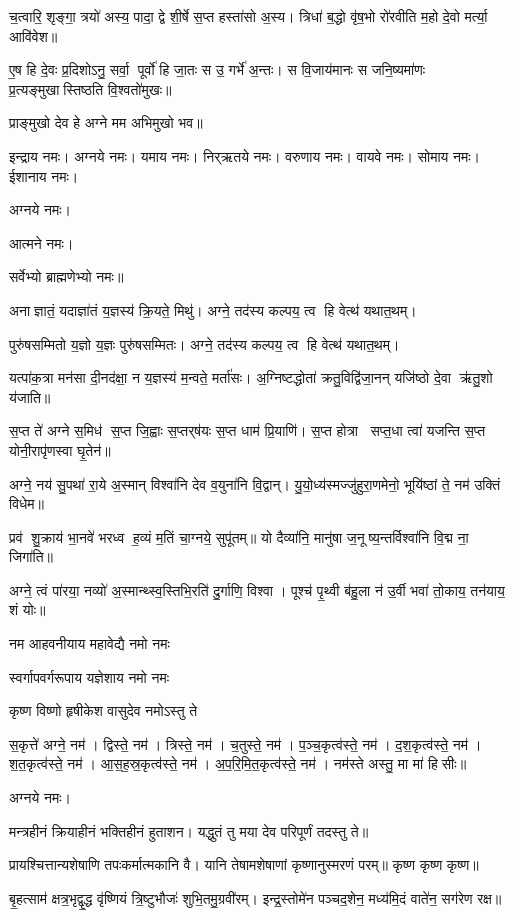 
च॒त्वारि॒ शृङ्गा॒ त्रयो॑ अस्य॒ पादा॒ द्वे शी॒र्\mbox{}षे स॒प्त हस्ता॑सो अ॒स्य। त्रिधा॑ ब॒द्धो वृ॑ष॒भो रो॑रवीति म॒हो दे॒वो मर्त्या॒ आवि॑वेश॥

ए॒ष हि दे॒वः प्र॒दिशोऽनु॒ सर्वा॒ पूर्वो॑ हि जा॒तः स उ॒ गर्भे॑ अ॒न्तः। स वि॒जाय॑मानः स जनि॒ष्यमा॑णः प्र॒त्यङ्मुखास्तिष्ठति वि॒श्वतो॑मुखः॥ 

प्राङ्मुखो देव हे अग्ने मम अभिमुखो भव॥

इन्द्राय नमः। अग्नये नमः। यमाय नमः। निर्‌ऋतये नमः। 
वरुणाय नमः। वायवे नमः। सोमाय नमः। ईशानाय नमः। 

अग्नये नमः। 

आत्मने नमः। 

सर्वेभ्यो ब्राह्मणेभ्यो नमः॥

अनाज्ञातं॒ यदाज्ञा॑तं य॒ज्ञस्य॑ क्रि॒यते॒ मिथु॑।
अग्ने॒ तद॑स्य कल्पय॒ त्व हि वेत्थ॑ यथात॒थम्।

पुरु॑षसम्मितो य॒ज्ञो य॒ज्ञः पुरु॑षसम्मितः।
अग्ने॒ तद॑स्य कल्पय॒ त्व हि वेत्थ॑ यथात॒थम्।

यत्पा॑क॒त्रा मन॑सा दी॒नद॑क्षा॒ न य॒ज्ञस्य॑ म॒न्वते॒ मर्ता॑सः।
अ॒ग्निष्टद्धोता॑ क्रतु॒विद्वि॑जा॒नन् यजि॑ष्ठो दे॒वा ऋ॑तु॒शो य॑जाति॥

स॒प्त ते॑ अग्ने स॒मिध॑ स॒प्त जि॒ह्वाः स॒प्तर्‌ष॑यः स॒प्त धाम॑ प्रि॒याणि॑। स॒प्त होत्रा सप्त॒धा त्वा॑ यजन्ति स॒प्त योनी॒रापृ॑णस्वा घृ॒तेन॑॥


अग्ने॒ नय॑ सु॒पथा॑ रा॒ये अ॒स्मान् विश्वा॑नि देव व॒युना॑नि वि॒द्वान्। यु॒यो॒ध्य॑स्मज्जु॑हुरा॒णमेनो॒ भूयि॑ष्ठां ते॒ नम॑ उक्तिं विधेम॥ 

प्रव॑ शु॒क्राय॑ भा॒नवे॑ भरध्व ह॒व्यं म॒तिं चा॒ग्नये॒ सुपू॑तम्॥ यो दैव्या॑नि॒ मानु॑षा ज॒नूष्य॒न्तर्विश्वा॑नि वि॒द्म ना॒ जिगा॑ति॥

अग्ने॒ त्वं पा॑रया॒ नव्यो॑ अ॒स्मान्थ्स्व॒स्तिभि॒रति॑ दु॒र्गाणि॒ विश्वा।
पूश्च॑ पृ॒थ्वी ब॑हु॒ला न॑ उ॒र्वी भवा॑ तो॒काय॒ तन॑याय॒ शं योः॥

{नम आहवनीयाय महावेद्यै नमो नमः}

{स्वर्गापवर्गरूपाय यज्ञेशाय नमो नमः}

{कृष्ण विष्णो हृषीकेश वासुदेव नमोऽस्तु ते}

स॒कृत्ते॑ अग्ने॒ नम॑। द्विस्ते॒ नम॑। त्रिस्ते॒ नम॑। च॒तुस्ते॒ नम॑। प॒ञ्च॒कृत्व॑स्ते॒ नम॑। द॒श॒कृत्व॑स्ते॒ नम॑। श॒त॒कृत्व॑स्ते॒ नम॑। आ॒स॒ह॒स्र॒कृत्व॑स्ते॒ नम॑। अ॒प॒रि॒मि॒त॒कृत्व॑स्ते॒ नम॑। नम॑स्ते अस्तु॒ मा मा॑ हिसीः॥

अग्नये नमः।

मन्त्रहीनं क्रियाहीनं भक्तिहीनं हुताशन।
यद्धुतं तु मया देव परिपूर्णं तदस्तु ते॥

प्रायश्चित्तान्यशेषाणि तपःकर्मात्मकानि वै।
यानि तेषामशेषाणां कृष्णानुस्मरणं परम्॥
कृष्ण कृष्ण कृष्ण॥

बृ॒हत्साम॑ क्षत्र॒भृद्वृ॒द्ध वृ॑ष्णियं त्रि॒ष्टुभौजः॑ शुभि॒तमु॒ग्रवी॑रम्।
इन्द्र॒स्तोमे॑न पञ्चद॒शेन॒ मध्य॑मि॒दं वाते॑न॒ सग॑रेण रक्ष॥
